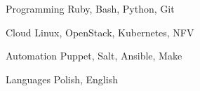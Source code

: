 

\begin{cvskills}

  \cvskill
    {Programming} %
    {Ruby, Bash, Python, Git} %

  \cvskill
    {Cloud} %
    {Linux, OpenStack, Kubernetes, NFV} %

  \cvskill
    {Automation} %
    {Puppet, Salt, Ansible, Make} %

  \cvskill
    {Languages} %
    {Polish, English} %

\end{cvskills}

